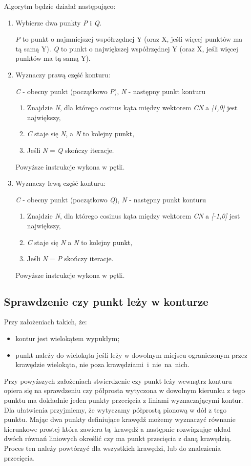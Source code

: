 \documentclass[a4paper,11pt]{article}
\begin{document}
\noindent
Algorytm będzie działał następująco:
\begin{enumerate}
\item Wybierze dwa punkty \textit{P} i \textit{Q}.

\textit{P} to punkt o najmniejszej współrzędnej Y (oraz X, jeśli więcej punktów ma tą samą Y). \textit{Q} to punkt o największej współrzędnej Y (oraz X, jeśli więcej punktów ma tą samą Y).

\item Wyznaczy prawą część konturu:

\textit{C} - obecny punkt (początkowo \textit{P}), \textit{N} - następny punkt konturu 
\begin{enumerate}
\item Znajdzie \textit{N}, dla którego cosinus kąta między wektorem \textit{CN} a\textit{ [1,0]} jest największy,
\item \textit{C} staje się \textit{N}, a \textit{N} to kolejny punkt,
\item Jeśli \textit{N} = \textit{Q} skończy iteracje.
\end{enumerate}
Powyższe instrukcje wykona w pętli.

\item Wyznaczy lewą część konturu:

\textit{C} - obecny punkt (początkowo \textit{Q}), \textit{N} - następny punkt konturu 
\begin{enumerate}
\item Znajdzie \textit{N}, dla którego cosinus kąta między wektorem \textit{CN} a\textit{ [-1,0]} jest największy,
\item \textit{C} staje się \textit{N} a \textit{N} to kolejny punkt,
\item Jeśli \textit{N} = \textit{P} skończy iteracje.
\end{enumerate}
Powyższe instrukcje wykona w pętli.
\end{enumerate}
\subsection{Sprawdzenie czy punkt leży w konturze}
Przy założeniach takich, że:
\begin{itemize}
\item kontur jest wielokątem wypukłym;
\item punkt należy do wielokąta jeśli leży w dowolnym miejscu ograniczonym przez krawędzie wielokąta, nie poza krawędziami~i~nie~na~nich.
\end{itemize}
Przy powyższych założeniach stwierdzenie czy punkt leży wewnątrz konturu opiera się na sprawdzeniu czy półprosta wytyczona w dowolnym kierunku z tego punktu ma dokładnie jeden punkty przecięcia z liniami wyznaczającymi kontur. Dla ułatwienia przyjmiemy, że wytyczamy półprostą pionową w dół z tego punktu. Mając dwa punkty definiujące krawędź możemy wyznaczyć równanie kierunkowe prostej która zawiera tą~krawędź a następnie rozwiązując układ dwóch równań liniowych określić czy ma punkt przecięcia z daną krawędzią. Proces ten należy powtórzyć dla wszystkich krawędzi, lub do znalezienia przecięcia.
 
\end{document}
